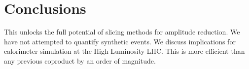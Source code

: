 \section{Conclusions}\label{sec:conclusions}

This unlocks the full potential of slicing methods for amplitude
reduction. We have not attempted to quantify synthetic events. We
discuss implications for calorimeter simulation at the High-Luminosity
LHC. This is more efficient than any previous coproduct by an order of
magnitude.

